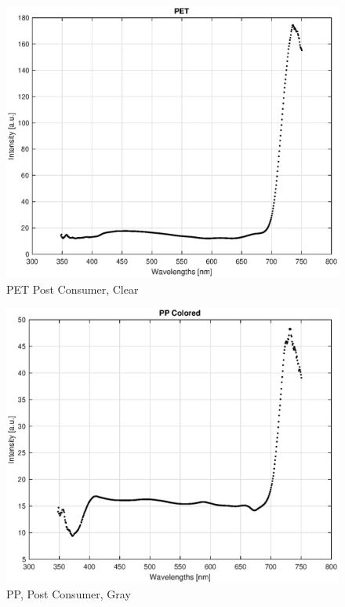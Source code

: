 \begin{appendices}
\begin{figure}
    \centering
    \includegraphics[width = 12cm]{Images/appendix/pet-postconsum.eps}
    \caption{PET Post Consumer, Clear}
    \label{fig:pet-pc}
\end{figure}

\begin{figure}
    \centering
    \includegraphics[width = 12cm]{Images/appendix/pp-postconsum-gray.eps}
    \caption{PP, Post Consumer, Gray}
    \label{fig:pp-gray}
\end{figure}


\end{appendices}

